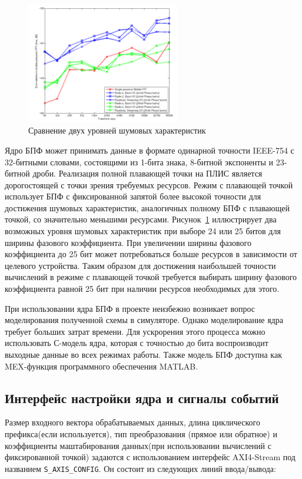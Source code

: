 \begin{figure}[h]
	\centering
	\includegraphics[width=0.6\textwidth]{image/fft_xilinx_fp.png}
	\caption{Сравнение двух уровней шумовых характеристик}
	\label{fft_xilinx_fp}
\end{figure}

Ядро БПФ может принимать данные в формате одинарной точности IEEE-754 с 32-битными словами, состоящими из 1-бита знака, 8-битной экспоненты и 23-битной дроби. Реализация полной плавающей точки на ПЛИС является дорогостоящей с точки зрения требуемых ресурсов. Режим с плавающей точкой использует БПФ с фиксированной запятой более высокой точности для достижения шумовых характеристик, аналогичных полному БПФ с плавающей точкой, со значительно меньшими ресурсами. Рисунок~\ref{fft_xilinx_fp} иллюстрирует два возможных уровня шумовых характеристик при выборе 24 или 25 битов для ширины фазового коэффициента. При увеличении ширины фазового коэффициента до 25 бит может потребоваться больше ресурсов в зависимости от целевого устройства. Таким образом для достижения наибольшей точности вычислений в режиме с плавающей точкой требуется выбирать ширину фазового коэффициента равной 25 бит при наличии ресурсов необходимых для этого.

При использовании ядра БПФ в проекте неизбежно возникает вопрос моделирования полученной схемы в симуляторе. Однако моделирование ядра требует больших затрат времени. Для ускрорения этого процесса можно использовать С-модель ядра, которая с точностью до бита воспроизводит выходные данные во всех режимах работы. Также модель БПФ доступна как MEX-функция программного обеспечения MATLAB.

\subsection{Интерфейс настройки ядра и сигналы событий}

Размер входного вектора обрабатываемых данных, длина циклического префикса(если используется), тип преобразования (прямое или обратное) и коэффициенты маштабирования данных(при использовании вычислений с фиксированной точкой) задаются с использованием интерфейс AXI4-Stream под названием \verb|S_AXIS_CONFIG|. 
Он состоит из следующих линий ввода/вывода: 

